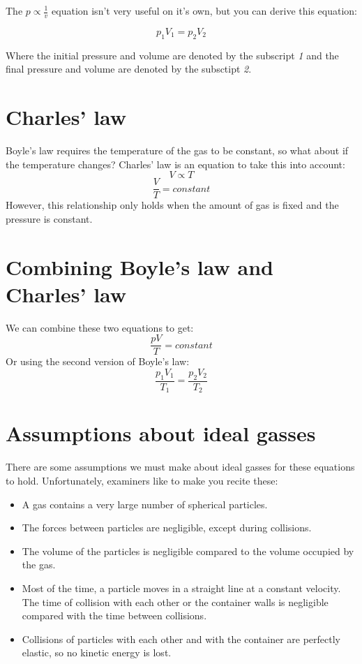\documentclass{article}
\begin{document}
The $p \propto \frac{1}{v}$ equation isn't very useful on it's own, but you can
derive this equation:

\[
	p_1V_1 = p_2V_2
\]

Where the initial pressure and volume are denoted by the subscript \textit{1}
and the final pressure and volume are denoted by the subsctipt \textit{2}.

\section*{Charles' law}
Boyle's law requires the temperature of the gas to be constant, so what about if
the temperature changes? Charles' law is an equation to take this into account:
\[
	V \propto T
\]
\[
	\frac{V}{T} = constant
\]
However, this relationship only holds when the amount of gas is fixed and the
pressure is constant.

\section*{Combining Boyle's law and Charles' law}
We can combine these two equations to get:
\[
	\frac{pV}{T} = constant
\]
Or using the second version of Boyle's law:
\[
	\frac{p_1V_1}{T_1} = \frac{p_2V_2}{T_2}
\]

\section*{Assumptions about ideal gasses}
There are some assumptions we must make about ideal gasses for these equations
to hold. Unfortunately, examiners like to make you recite these:

\begin{itemize}
	\item A gas contains a very large number of spherical particles.
	\item The forces between particles are negligible, except during collisions.
	\item The volume of the particles is negligible compared to the volume
	occupied by the gas.
	\item Most of the time, a particle moves in a straight line at a constant
	velocity. The time of collision with each other or the container walls is
	negligible compared with the time between collisions.
	\item Collisions of particles with each other and with the container are
	perfectly elastic, so no kinetic energy is lost.
\end{itemize}
\end{document}
